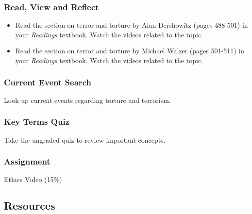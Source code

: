 \documentclass[
]{book}
\providecommand{\tightlist}{%
  \setlength{\itemsep}{0pt}\setlength{\parskip}{0pt}}
\begin{document}
\begin{reflect}
\hypertarget{read-view-and-reflect-28}{%
\subsubsection*{Read, View and Reflect}\label{read-view-and-reflect-28}}

\begin{itemize}
\tightlist
\item
  Read the section on terror and torture by Alan Dershowitz (pages 488-501) in your \emph{Readings} textbook. Watch the videos related to the topic.\\
\item
  Read the section on terror and torture by Michael Walzer (pages 501-511) in your \emph{Readings} textbook. Watch the videos related to the topic.
\end{itemize}

\hypertarget{current-event-search}{%
\subsubsection*{Current Event Search}\label{current-event-search}}

Look up current events regarding torture and terrorism.

\hypertarget{key-terms-quiz-7}{%
\subsubsection*{Key Terms Quiz}\label{key-terms-quiz-7}}

Take the ungraded quiz to review important concepts.

\hypertarget{assignment-6}{%
\subsubsection*{\texorpdfstring{\textbf{Assignment}}{Assignment}}\label{assignment-6}}

Ethics Video (15\%)
\end{reflect}

\hypertarget{resources-8}{%
\subsection*{Resources}\label{resources-8}}
\end{document}
